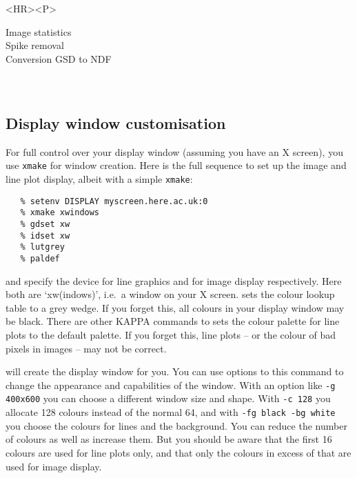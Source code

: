 \begin{htmlonly}
\begin{rawhtml} <HR><P> \end{rawhtml}
{\bf {}} Image statistics\\
{\bf {}} Spike removal\\
{\bf {}} Conversion GSD to NDF\\
{\bf {}}\\
{\bf {}}\\
\end{htmlonly}


\subsection{\label{xmake}Display window customisation}

   For full control over your display window (assuming you have an X
   screen), you use {\tt xmake} for window creation. Here is the full
   sequence to set up the image and line plot display, albeit with a
   simple {\tt xmake}:

\begin{verbatim}
   % setenv DISPLAY myscreen.here.ac.uk:0
   % xmake xwindows
   % gdset xw
   % idset xw
   % lutgrey
   % paldef
\end{verbatim}

{\tt {}}
   and
{\tt {}}
   specify the device for line graphics and for image display respectively.
   Here both are `xw(indows)', i.e.\ a window on your X screen.
{\tt {}}
   sets the colour lookup table to a grey wedge. If
   you forget this, all colours in your display window may be black.
   There are other KAPPA commands to
{\tt {}}
   sets the colour palette for line plots to the default palette. If
   you forget this, line plots -- or the colour of bad pixels in images --
   may not be correct.

{\tt {}}
   will create the display window for you. You can use options to this
   command to change the appearance and capabilities of the window. With
   an option like {\tt -g 400x600} you can choose a different window
   size and shape. With {\tt -c 128} you allocate 128 colours instead
   of the normal 64, and with {\tt -fg black -bg white} you choose
   the colours for lines and the background. You can reduce the number
   of colours as well as increase them. But you should be aware that
   the first 16 colours are used for line plots only, and that only the
   colours in excess of that are used for image display.

